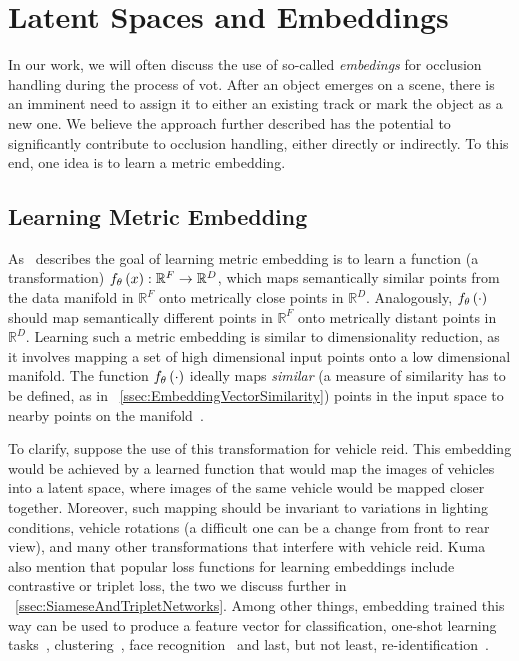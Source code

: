 \section{Latent Spaces and Embeddings}
\label{sec:LatentSpacesAndEmbeddings}

In our work, we will often discuss the use of so-called \emph{embedings} for occlusion handling during the process of \gls{vot}. After an object emerges on a scene, there is an imminent need to assign it to either an existing track or mark the object as a new one. We believe the approach further described has the potential to significantly contribute to occlusion handling, either directly or indirectly. To this end, one idea is to learn a metric embedding.

\subsection{Learning Metric Embedding}
\label{ssec:LearningMetricEmbedding}

As~\cite{hermans2017triplet} describes the goal of learning metric embedding is to learn a function (a transformation) ${f_\theta} \left( x \right): \mathbb{R}^F \to \mathbb{R}^D$, which maps semantically similar points from the data manifold in $\mathbb{R}^F$ onto metrically close points in $\mathbb{R}^D$. Analogously, ${f_\theta} \left( \cdot \right)$ should map semantically different points in $\mathbb{R}^F$ onto metrically distant points in $\mathbb{R}^D$. Learning such a metric embedding is similar to dimensionality reduction, as it involves mapping a set of high dimensional input points onto a low dimensional manifold. The function ${f_\theta} \left( \cdot \right)$ ideally maps \emph{similar} (a measure of similarity has to be defined, as in \sectiontext{}~\ref{ssec:EmbeddingVectorSimilarity}) points in the input space to nearby points on the manifold~\cite{hadsell2006dimreduction}.

To clarify, suppose the use of this transformation for vehicle \gls{reid}. This embedding would be achieved by a learned function that would map the images of vehicles into a latent space, where images of the same vehicle would be mapped closer together. Moreover, such mapping should be invariant to variations in lighting conditions, vehicle rotations (a difficult one can be a change from front to rear view), and many other transformations that interfere with vehicle \gls{reid}. Kuma~\etal{}~\cite{kuma2019vehiclereid} also mention that popular loss functions for learning embeddings include contrastive or triplet loss, the two we discuss further in \sectiontext{}~\ref{ssec:SiameseAndTripletNetworks}. Among other things, embedding trained this way can be used to produce a feature vector for classification, one-shot learning tasks~\cite{koch2015siameseoneshot}, clustering~\cite{schroff2015facenet}, face recognition~\cite{parkhi2015deepface} and last, but not least, re-identification~\cite{kuma2019vehiclereid}.

